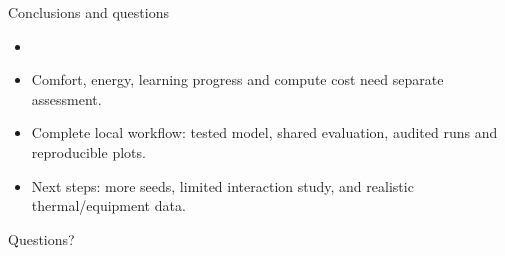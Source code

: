 \documentclass[aspectratio=169,10pt]{beamer}
\begin{document}
\begin{frame}{Conclusions and questions}
\begin{itemize}
\item \SlideConclusion{}
\item Comfort, energy, learning progress and compute cost need separate assessment.
\item Complete local workflow: tested model, shared evaluation, audited runs and reproducible plots.
\item Next steps: more seeds, limited interaction study, and realistic thermal/equipment data.
\end{itemize}
\vspace{5mm}
\centering\Large Questions?
\end{frame}
\end{document}
